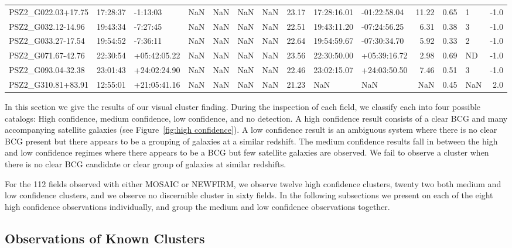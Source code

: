 \documentclass[apj, revtex4]{emulateapj}
\begin{document}
\begin{table}
\begin{tabular}{lllrrrrrllrrlr}
 PSZ2\_G022.03+17.75 &  17:28:37 &      -1:13:03 & NaN &  NaN &   NaN &  NaN &    23.17 &   17:28:16.01 &  -01:22:58.04 &    11.22 &  0.65 &    1 &  -1.0 \\
 PSZ2\_G032.12-14.96 &  19:43:34 &      -7:27:45 & NaN &  NaN &   NaN &  NaN &    22.51 &   19:43:11.20 &  -07:24:56.25 &     6.31 &  0.38 &    3 &  -1.0 \\
 PSZ2\_G033.27-17.54 &  19:54:52 &      -7:36:11 & NaN &  NaN &   NaN &  NaN &    22.64 &   19:54:59.67 &  -07:30:34.70 &     5.92 &  0.33 &    2 &  -1.0 \\
 PSZ2\_G071.67-42.76 &  22:30:54 &  +05:42:05.22 & NaN &  NaN &   NaN &  NaN &    23.56 &   22:30:50.00 &  +05:39:16.72 &     2.98 &  0.69 &   ND &  -1.0 \\
 PSZ2\_G093.04-32.38 &  23:01:43 &  +24:02:24.90 & NaN &  NaN &   NaN &  NaN &    22.46 &   23:02:15.07 &  +24:03:50.50 &     7.46 &  0.51 &    3 &  -1.0 \\
 PSZ2\_G310.81+83.91 &  12:55:01 &  +21:05:41.16 & NaN &  NaN &   NaN &  NaN &    21.23 &           NaN &           NaN &      NaN &  0.45 &  NaN &   2.0 \\
	\hline
\end{tabular}
\label{tbl:preobserved} 
\end{table}

In this section we give the results of our visual cluster finding. During the inspection of each field, we classify each into four possible catalogs: High confidence, medium confidence, low confidence, and no detection. A high confidence result consists of a clear BCG and many accompanying satellite galaxies (see Figure~\ref{fig:high confidence}). A low confidence result is an ambiguous system where there is no clear BCG present but there appears to be a grouping of galaxies at a similar redshift. The medium confidence results fall in between the high and low confidence regimes where there appears to be a BCG but few satellite galaxies are observed. We fail to observe a cluster when there is no clear BCG candidate or clear group of galaxies at similar redshifts.

For the 112 fields observed with either MOSAIC or NEWFIRM, we observe twelve high confidence clusters, twenty two both medium and low confidence clusters, and we observe no discernible cluster in sixty fields. In the following subsections we present on each of the eight high confidence observations individually, and group the medium and low confidence observations together.


\subsection{Observations of Known Clusters}
\end{document}

